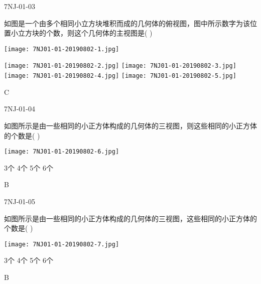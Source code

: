 \begin{defproblem}{7NJ-01-03}%
\begin{onlyproblem}%
如图是一个由多个相同小立方块堆积而成的几何体的俯视图，图中所示数字为该位置小立方块的个数，则这个几何体的主视图是(    )
\begin{center}
\texttt{[image: 7NJ01-01-20190802-1.jpg]}
\end{center}

\begin{center}
\texttt{[image: 7NJ01-01-20190802-2.jpg]}
\texttt{[image: 7NJ01-01-20190802-3.jpg]}
\texttt{[image: 7NJ01-01-20190802-4.jpg]}
\texttt{[image: 7NJ01-01-20190802-5.jpg]}
\end{center}

\end{onlyproblem}%
\begin{onlysolution}%
\begin{solution}%
C
\end{solution}%
\end{onlysolution}%
\end{defproblem}




\begin{defproblem}{7NJ-01-04}%
\begin{onlyproblem}%
如图所示是由一些相同的小正方体构成的几何体的三视图，则这些相同的小正方体的个数是(    )
\begin{center}
\texttt{[image: 7NJ01-01-20190802-6.jpg]}
\end{center}

\xx
{3个}
{4个}
{5个}
{6个}

\end{onlyproblem}%
\begin{onlysolution}%
\begin{solution}%
B
\end{solution}%
\end{onlysolution}%
\end{defproblem}



\begin{defproblem}{7NJ-01-05}%
\begin{onlyproblem}%
如图所示是由一些相同的小正方体构成的几何体的三视图，这些相同的小正方体的个数是(    )
\begin{center}
\texttt{[image: 7NJ01-01-20190802-7.jpg]}
\end{center}

\xx
{3个}
{4个}
{5个}
{6个}

\end{onlyproblem}%
\begin{onlysolution}%
\begin{solution}%
B
\end{solution}%
\end{onlysolution}%
\end{defproblem}




